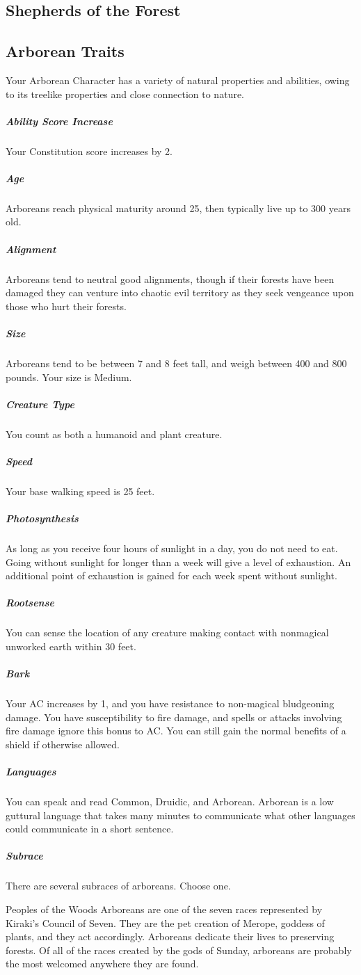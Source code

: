 \subsection{Shepherds of the Forest}

\subsection{Arborean Traits}
Your Arborean Character has a variety of natural properties and abilities, owing to its treelike properties and close connection to nature.
\subparagraph{Ability Score Increase}Your Constitution score increases by 2.
\subparagraph{Age}Arboreans reach physical maturity around 25, then typically live up to 300 years old.
\subparagraph{Alignment}Arboreans tend to neutral good alignments, though if their forests have been damaged they can venture into chaotic evil territory as they seek vengeance upon those who hurt their forests.
\subparagraph{Size}Arboreans tend to be between 7 and 8 feet tall, and weigh between 400 and 800 pounds. Your size is Medium.
\subparagraph{Creature Type}You count as both a humanoid and plant creature.
\subparagraph{Speed}Your base walking speed is 25 feet. 
\subparagraph{Photosynthesis}As long as you receive four hours of sunlight in a day, you do not need to eat. Going without sunlight for longer than a week will give a level of exhaustion. An additional point of exhaustion is gained for each week spent without sunlight.
\subparagraph{Rootsense}You can sense the location of any creature making contact with nonmagical unworked earth within 30 feet.
\subparagraph{Bark}Your AC increases by 1, and you have resistance to non-magical bludgeoning damage. You have susceptibility to fire damage, and spells or attacks involving fire damage ignore this bonus to AC. You can still gain the normal benefits of a shield if otherwise allowed.
\subparagraph{Languages}You can speak and read Common, Druidic, and Arborean. Arborean is a low guttural language that takes many minutes to communicate what other languages could communicate in a short sentence.
\subparagraph{Subrace}
There are several subraces of arboreans. Choose one.
\begin{DndSidebar}[float=!b]{Peoples of the Woods}
  Arboreans are one of the seven races represented by Kiraki's Council of Seven. They are the pet creation of Merope, goddess of plants, and they act accordingly. Arboreans dedicate their lives to preserving forests. Of all of the races created by the gods of Sunday, arboreans are probably the most welcomed anywhere they are found.
\end{DndSidebar}
